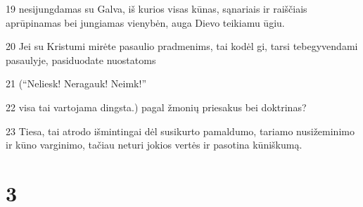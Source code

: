\par 19 nesijungdamas su Galva, iš kurios visas kūnas, sąnariais ir raiščiais aprūpinamas bei jungiamas vienybėn, auga Dievo teikiamu ūgiu. 
\par 20 Jei su Kristumi mirėte pasaulio pradmenims, tai kodėl gi, tarsi tebegyvendami pasaulyje, pasiduodate nuostatoms 
\par 21 (“Neliesk! Neragauk! Neimk!”­ 
\par 22 visa tai vartojama dingsta.) pagal žmonių priesakus bei doktrinas? 
\par 23 Tiesa, tai atrodo išmintingai dėl susikurto pamaldumo, tariamo nusižeminimo ir kūno varginimo, tačiau neturi jokios vertės ir pasotina kūniškumą.


\chapter{3}


